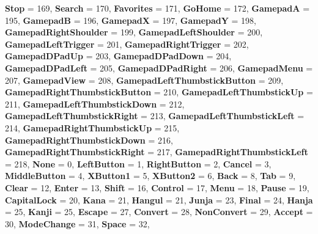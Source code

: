 \begin{DoxyCompactItemize}
{\bfseries Stop} = 169, 
{\bfseries Search} = 170, 
{\bfseries Favorites} = 171, 
{\bfseries Go\+Home} = 172, 
\newline
{\bfseries GamepadA} = 195, 
{\bfseries GamepadB} = 196, 
{\bfseries GamepadX} = 197, 
{\bfseries GamepadY} = 198, 
\newline
{\bfseries Gamepad\+Right\+Shoulder} = 199, 
{\bfseries Gamepad\+Left\+Shoulder} = 200, 
{\bfseries Gamepad\+Left\+Trigger} = 201, 
{\bfseries Gamepad\+Right\+Trigger} = 202, 
\newline
{\bfseries Gamepad\+D\+Pad\+Up} = 203, 
{\bfseries Gamepad\+D\+Pad\+Down} = 204, 
{\bfseries Gamepad\+D\+Pad\+Left} = 205, 
{\bfseries Gamepad\+D\+Pad\+Right} = 206, 
\newline
{\bfseries Gamepad\+Menu} = 207, 
{\bfseries Gamepad\+View} = 208, 
{\bfseries Gamepad\+Left\+Thumbstick\+Button} = 209, 
{\bfseries Gamepad\+Right\+Thumbstick\+Button} = 210, 
\newline
{\bfseries Gamepad\+Left\+Thumbstick\+Up} = 211, 
{\bfseries Gamepad\+Left\+Thumbstick\+Down} = 212, 
{\bfseries Gamepad\+Left\+Thumbstick\+Right} = 213, 
{\bfseries Gamepad\+Left\+Thumbstick\+Left} = 214, 
\newline
{\bfseries Gamepad\+Right\+Thumbstick\+Up} = 215, 
{\bfseries Gamepad\+Right\+Thumbstick\+Down} = 216, 
{\bfseries Gamepad\+Right\+Thumbstick\+Right} = 217, 
{\bfseries Gamepad\+Right\+Thumbstick\+Left} = 218, 
\newline
{\bfseries None} = 0, 
{\bfseries Left\+Button} = 1, 
{\bfseries Right\+Button} = 2, 
{\bfseries Cancel} = 3, 
\newline
{\bfseries Middle\+Button} = 4, 
{\bfseries X\+Button1} = 5, 
{\bfseries X\+Button2} = 6, 
{\bfseries Back} = 8, 
\newline
{\bfseries Tab} = 9, 
{\bfseries Clear} = 12, 
{\bfseries Enter} = 13, 
{\bfseries Shift} = 16, 
\newline
{\bfseries Control} = 17, 
{\bfseries Menu} = 18, 
{\bfseries Pause} = 19, 
{\bfseries Capital\+Lock} = 20, 
\newline
{\bfseries Kana} = 21, 
{\bfseries Hangul} = 21, 
{\bfseries Junja} = 23, 
{\bfseries Final} = 24, 
\newline
{\bfseries Hanja} = 25, 
{\bfseries Kanji} = 25, 
{\bfseries Escape} = 27, 
{\bfseries Convert} = 28, 
\newline
{\bfseries Non\+Convert} = 29, 
{\bfseries Accept} = 30, 
{\bfseries Mode\+Change} = 31, 
{\bfseries Space} = 32, 
\newline

\end{DoxyCompactItemize}
